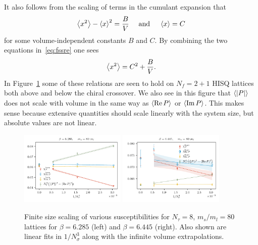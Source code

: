 It also follows from the scaling of terms in the cumulant expansion that
\begin{equation}\label{eq:fssre}
  \ev{x^2}-\ev{x}^2=\frac{B}{V}~~~~\text{and}~~~~\ev{x}=C
\end{equation}
for some volume-independent constants $B$ and $C$. By combining the two
equations in~\eqref{eq:fssre} one sees
\begin{equation}
  \ev{x^2}=C^2+\frac{B}{V}.
\end{equation}
In Figure~\ref{fig:FSSScalingOfSuscs} some of these relations are seen
to hold on $N_f=2+1$ HISQ lattices both above and below the chiral crossover.
We also see in this figure that $\ev{|P|}$ does not scale with volume 
in the same way as $\ev{\Re P}$ or $\ev{\Im P}$. This makes sense because
extensive quantities should scale linearly with the system size, but
absolute values are not linear. 

\begin{figure}
  \centering
  \includegraphics[width=0.45\textwidth]{figs/allSuscs_b6285.pdf}
  \includegraphics[width=0.45\textwidth]{figs/allSuscs_b6445.pdf}
  \caption{Finite size scaling of various susceptibilities
           for $N_\tau=8$, $m_s/m_l=80$ lattices for
           $\beta=6.285$ (left) and $\beta=6.445$ (right). Also shown are
           linear fits in $1/N_\sigma^3$ along with the
           infinite volume extrapolations.}
  \label{fig:FSSScalingOfSuscs}
\end{figure}


